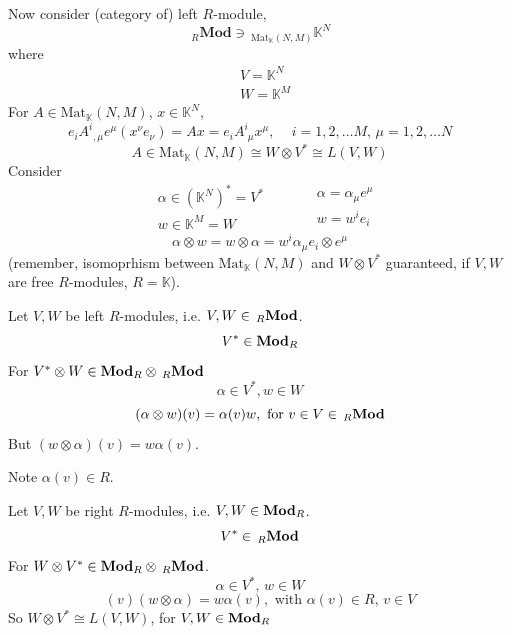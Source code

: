 Now consider (category of) left $R$-module, 
\begin{equation}
{\,}_R\textbf{Mod} \ni {\,}_{\text{Mat}_{\mathbb{K}}(N,M) } \mathbb{K}^N
\end{equation}
where
\[
\begin{aligned}
	& V=\mathbb{K}^N \\ 
&	  W = \mathbb{K}^M
\end{aligned}
\]
For $A\in \text{Mat}_{\mathbb{K}}(N,M)$, $x\in \mathbb{K}^N$, 
\[
e_i A^i_{ \,\ , \mu} e^{\mu}(x^{\nu} e_{\nu}) = Ax = e_iA^i_{\,\, \mu} x^{\mu} , \quad \, i=1,2,\dots M, \, \mu = 1,2, \dots N
\]
\[
A\in \text{Mat}_{\mathbb{K}}(N,M) \cong W\otimes V^* \cong L(V,W)
\]
Consider 
\[
\begin{aligned}
	& \alpha \in (\mathbb{K}^N)^* = V^* \\
	& w\in \mathbb{K}^M = W
\end{aligned} \qquad \, \begin{aligned}
	& \alpha = \alpha_{\mu} e^{\mu} \\ 
	& w=w^ie_i
\end{aligned}
\]
\[
\alpha \otimes w = w \otimes \alpha = w^i\alpha_{\mu} e_i \otimes e^{\mu}
\]
(remember, isomoprhism between $\text{Mat}_{\mathbb{K}}(N,M)$ and $W\otimes V^*$ guaranteed, if $V,W$ are free $R$-modules, $R=\mathbb{K}$).

Let $V,W$ be left $R$-modules, i.e. $V,W \in {\,}_R\text{\textbf{Mod}}$.  
\[
V^* \in \text{\textbf{Mod}}_R
\]
For $V^*\otimes W \in \text{\textbf{Mod}}_R\otimes {\,}_R\text{\textbf{Mod}}$  
\[
\alpha \in V^*, w\in W
\]
\[
(\alpha \otimes w)(v) = \alpha(v)w, \text{ for } v\in V \in {\,}_R\text{\textbf{Mod}}
\]
But $(w\otimes \alpha)(v) = w\alpha(v)$.  

Note $\alpha(v) \in R$.  

Let $V,W$ be right $R$-modules, i.e. $V,W \in \text{\textbf{Mod}}_R$.  
\[
V^* \in {\,}_R\text{\textbf{Mod}}
\]
For $W\otimes V^* \in \text{\textbf{Mod}}_R \otimes {\,}_R\text{\textbf{Mod}}$.  
\[
\alpha \in V^*, \, w\in W
\]
\[
(v)(w\otimes \alpha) = w\alpha(v), \text{ with } \alpha(v)\in R, \, v\in V
\]
So $W\otimes V^* \cong L(V,W)$, for $V,W\in \text{\textbf{Mod}}_R$

